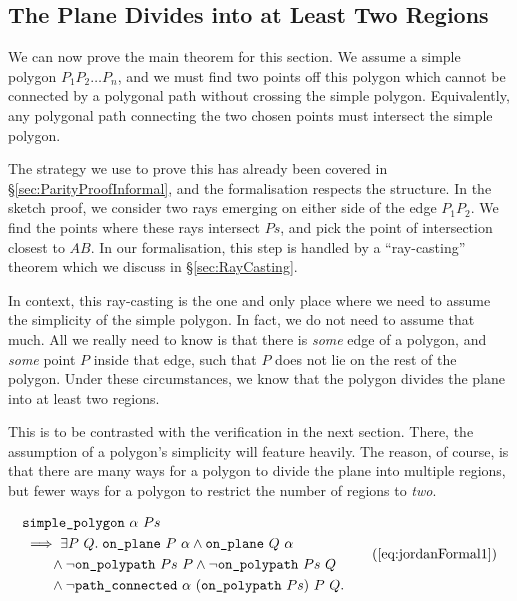 \subsection{The Plane Divides into at Least Two Regions}\label{sec:FinalProofJordan1}
We can now prove the main theorem for this section. We assume a simple polygon $P_1P_2\ldots P_n$, and we must find two points off this polygon which cannot be connected by a polygonal path without crossing the simple polygon. Equivalently, any polygonal path connecting the two chosen points must intersect the simple polygon.

The strategy we use to prove this has already been covered in \S\ref{sec:ParityProofInformal}, and the formalisation respects the structure. In the sketch proof, we consider two rays emerging on either side of the edge $P_1P_2$. We find the points where these rays intersect $Ps$, and pick the point of intersection closest to $AB$. In our formalisation, this step is handled by a ``ray-casting'' theorem which we discuss in \S\ref{sec:RayCasting}. 

In context, this ray-casting is the one and only place where we need to assume the simplicity of the simple polygon. In fact, we do not need to assume that much. All we really need to know is that there is \emph{some} edge of a polygon, and \emph{some} point $P$ inside that edge, such that $P$ does not lie on the rest of the polygon. Under these circumstances, we know that the polygon divides the plane into at least two regions.

This is to be contrasted with the verification in the next section. There, the assumption of a polygon's simplicity will feature heavily. The reason, of course, is that there are many ways for a polygon to divide the plane into multiple regions, but fewer ways for a polygon to restrict the number of regions to \emph{two}.

\begin{equation}
  \begin{split}
    &\code{simple\_polygon}\ \alpha\ Ps\\
    &\implies \exists P\ Q.\; \code{on\_plane}\ P\ \alpha \wedge \code{on\_plane}\ Q\ \alpha\\
    &\qquad\wedge \neg\code{on\_polypath}\ Ps\ P \wedge \neg\code{on\_polypath}\ Ps\ Q\\
    &\qquad\wedge \neg\code{path\_connected}\ \alpha\ (\code{on\_polypath}\ Ps)\ P\ Q.
  \end{split}\tag{\ref{eq:jordanFormal1}}
\end{equation}

